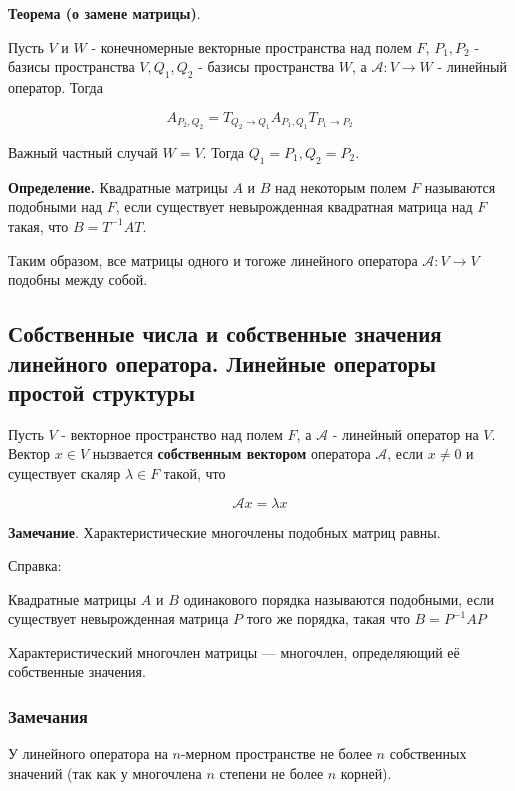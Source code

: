 \documentclass[a4paper]{article}
\begin{document}
\begin{htheorem}\textbf{Теорема (о замене матрицы)}.

Пусть $V$ и $W$ - конечномерные векторные пространства над полем $F$, $P_1, P_2$ - базисы пространства $V, Q_1, Q_2$ - базисы пространства $W$, а $\mathcal{A}: V \rightarrow W$ - линейный оператор. Тогда 

\[
A_{P_2, Q_2} = T_{Q_2 \rightarrow Q_1} A_{P_1,Q_1} T_{P_1 \rightarrow P_2}
\]

Важный частный случай $W=V$. Тогда $Q_1 = P_1, Q_2=P_2$.
\end{htheorem}

\textbf{Определение.} Квадратные матрицы $A$ и $B$ над некоторым полем $F$ называются подобными над $F$, если существует невырожденная квадратная матрица над $F$ такая, что $B = T^{-1}AT$.

Таким образом, все матрицы одного и тогоже линейного оператора $\mathcal{A}: V \rightarrow V$ подобны между собой.

\subsection*{Собственные числа и собственные значения линейного оператора. Линейные операторы простой структуры}

Пусть $V$ - векторное пространство над полем $F$, а $\mathcal{A}$ - линейный оператор на $V$. Вектор $x \in V$ нызвается \textbf{собственным вектором} оператора $\mathcal{A}$, если $x \neq 0$ и существует скаляр $\lambda \in F$ такой, что 

\[
\mathcal{A}x = \lambda x
\]

\begin{htheorem}\textbf{Замечание}.
Характеристические многочлены подобных матриц равны.

Справка: 

Квадратные матрицы $A$ и $B$ одинакового порядка называются подобными, если существует невырожденная матрица $P$ того же порядка, такая что $B = P^{-1} AP$

Характеристический многочлен матрицы — многочлен, определяющий её собственные значения.
\end{htheorem}

\subsubsection*{Замечания}
У линейного оператора на $n$-мерном пространстве не более $n$ собственных значений (так как у многочлена $n$ степени не более $n$ корней).
\end{document}
